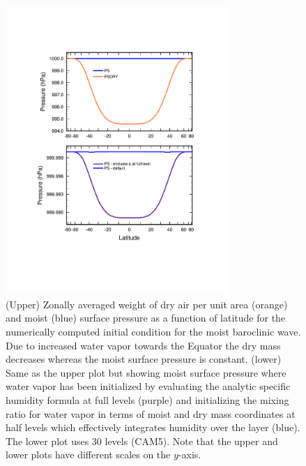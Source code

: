 \documentclass{agujournal}
\begin{document}
\begin{figure}[h]
\centering
\includegraphics[width=20pc]{figs/01_baro_init.pdf}
\caption{(Upper) Zonally averaged weight of dry air per unit area (orange) and moist (blue) surface pressure as a function of latitude for the numerically computed initial condition for the moist baroclinic wave. Due to increased water vapor towards the Equator the dry mass decreases whereas the moist surface pressure is constant. (lower) Same as the upper plot but showing moist surface pressure where water vapor has been initialized by evaluating the analytic specific humidity formula at full levels (purple) and initializing the mixing ratio for water vapor in terms of moist and dry mass coordinates at half levels which effectively integrates humidity over the layer (blue). The lower plot uses 30 levels (CAM5). Note that the upper and lower plots have different scales on the $y$-axis.}
\label{fig:baro_init}
\end{figure}
\end{document}
